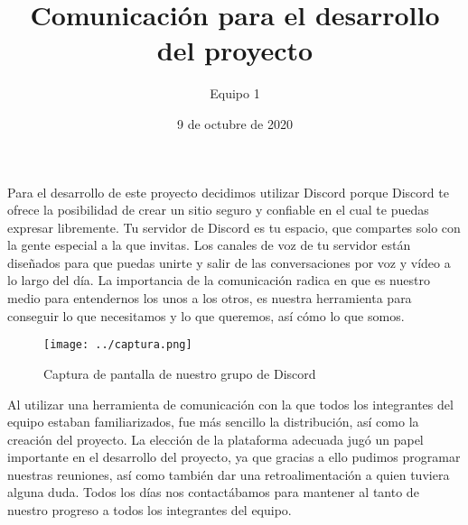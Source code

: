 \documentclass[14pt, twocolumn]{report}
\title{Comunicación para el desarrollo del proyecto}
\author{Equipo 1}
\date{9 de octubre de 2020}
\begin{document}
\maketitle 
Para el desarrollo de este proyecto decidimos utilizar Discord porque Discord te ofrece la posibilidad de crear un sitio seguro y confiable en el cual te puedas expresar libremente. Tu servidor de Discord es tu espacio, que compartes solo con la gente especial a la que invitas. Los canales de voz de tu servidor están diseñados para que puedas unirte y salir de las conversaciones por voz y vídeo a lo largo del día. La importancia de la comunicación radica en que es nuestro medio para entendernos los unos a los otros, es nuestra herramienta para conseguir lo que necesitamos y lo que queremos, así cómo lo que somos. 


\begin{figure}[htb]


\texttt{[image: ../captura.png]} 
\caption{Captura de pantalla de nuestro grupo de Discord}
\label{fig:captura}
\end{figure}

Al utilizar una herramienta de comunicación con la que todos los integrantes del equipo estaban familiarizados, fue más sencillo la distribución, así como la creación del proyecto. La elección de la plataforma adecuada jugó un papel importante en el desarrollo del proyecto, ya que gracias a ello pudimos programar nuestras reuniones, así como también dar una retroalimentación a quien tuviera alguna duda. Todos los días nos contactábamos para mantener al tanto de nuestro progreso a todos los integrantes del equipo.
\end{document}
